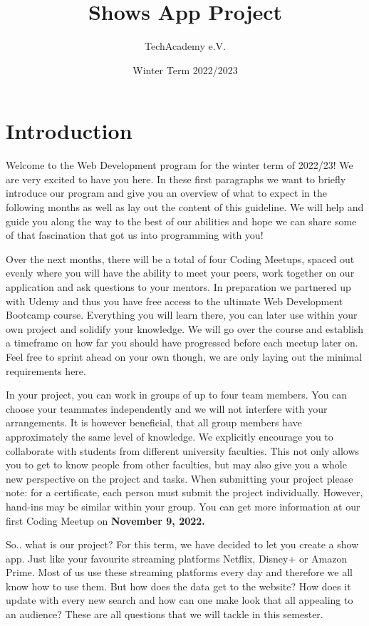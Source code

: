 \documentclass[
]{article}
\title{Shows App Project}
\author{TechAcademy e.V.}
\date{Winter Term 2022/2023}
\begin{document}
\maketitle

{
\setcounter{tocdepth}{2}
\tableofcontents
}
\hypertarget{introduction}{%
\section{Introduction}\label{introduction}}

Welcome to the Web Development program for the winter term of 2022/23! We are very excited to have you here. In these first paragraphs we want to briefly introduce our program and give you an overview of what to expect in the following months as well as lay out the content of this guideline. We will help and guide you along the way to the best of our abilities and hope we can share some of that fascination that got us into programming with you!

Over the next months, there will be a total of four Coding Meetups, spaced out evenly where you will have the ability to meet your peers, work together on our application and ask questions to your mentors. In preparation we partnered up with Udemy and thus you have free access to the ultimate Web Development Bootcamp course. Everything you will learn there, you can later use within your own project and solidify your knowledge. We will go over the course and establish a timeframe on how far you should have progressed before each meetup later on. Feel free to sprint ahead on your own though, we are only laying out the minimal requirements here.

In your project, you can work in groups of up to four team members. You can choose your teammates independently and we will not interfere with your arrangements. It is however beneficial, that all group members have approximately the same level of knowledge. We explicitly encourage you to collaborate with students from different university faculties. This not only allows you to get to know people from other faculties, but may also give you a whole new perspective on the project and tasks. When submitting your project please note: for a certificate, each person must submit the project individually. However, hand-ins may be similar within your group. You can get more information at our first Coding Meetup on \textbf{November 9, 2022.}

So.. what is our project? For this term, we have decided to let you create a show app. Just like your favourite streaming platforms Netflix, Disney+ or Amazon Prime. Most of us use these streaming platforms every day and therefore we all know how to use them. But how does the data get to the website? How does it update with every new search and how can one make look that all appealing to an audience? These are all questions that we will tackle in this semester.
\end{document}
